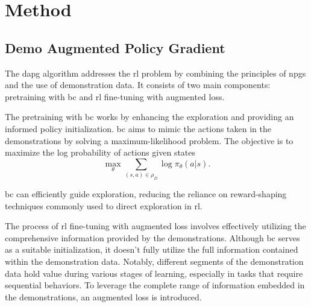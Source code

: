 \section{Method}\label{sec:3-in-hand-manipulation-method}

\subsection{Demo Augmented Policy Gradient}\label{dapg}

The \gls{dapg} algorithm addresses the \gls{rl} problem by combining the principles of \gls{npg}s and the use of demonstration data. It consists of two main components: pretraining with \gls{bc} and \gls{rl} fine-tuning with augmented loss. \medskip

The pretraining with \gls{bc} works by enhancing the exploration and providing an informed policy initialization. \gls{bc} aims to mimic the actions taken in the demonstrations by solving a maximum-likelihood problem. The objective is to maximize the log probability of actions given states
%
\begin{equation}
	\max_{\theta} \sum_{(s, a) \in \rho_D} \log \pi_{\theta}(a|s).
\end{equation}

\gls{bc} can efficiently guide exploration, reducing the reliance on reward-shaping techniques commonly used to direct exploration in \gls{rl}. \medskip

The process of \gls{rl} fine-tuning with augmented loss involves effectively utilizing the comprehensive information provided by the demonstrations. Although \gls{bc} serves as a suitable initialization, it doesn't fully utilize the full information contained within the demonstration data. Notably, different segments of the demonstration data hold value during various stages of learning, especially in tasks that require sequential behaviors. To leverage the complete range of information embedded in the demonstrations, an augmented loss is introduced.\medskip


